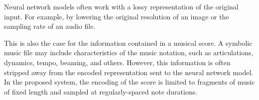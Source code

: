 
Neural network models often work with a lossy representation
of the original input. For example, by lowering the original
resolution of an image or the sampling rate of an audio
file.

This is also the case for the information contained in a
musical score. A symbolic music file may include
characteristics of the music notation, such as
articulations, dynamics, tempo, beaming, and others.
However, this information is often stripped away from the
encoded representation sent to the neural network model. In
the proposed system, the encoding of the score is limited to
fragments of music of fixed length and sampled at
regularly-spaced note durations.
